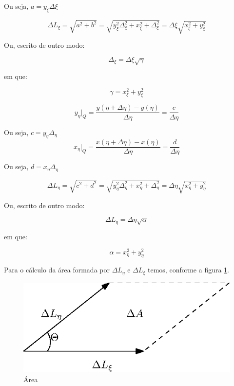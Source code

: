 Ou seja, $a=y_\xi \Delta \xi$

\begin{equation*}
    \Delta L_\xi = \sqrt{a^2+b^2} = \sqrt{y_\xi^2 \Delta_\xi^2 + x_\xi^2+\Delta_\xi^2} = \Delta \xi \sqrt{x_\xi^2 + y_\xi^2}
\end{equation*}

Ou, escrito de outro modo:

\begin{equation}
    \label{eq:2.11}
    \Delta_\xi = \Delta \xi \sqrt{\gamma}
\end{equation}

em que:

\begin{equation}
    \label{eq:2.12}
    \gamma = x_\xi^2 + y_\xi^2
\end{equation}

\begin{equation*}
    y_\eta \vert_Q = \frac{y(\eta+\Delta \eta)-y(\eta)}{\Delta \eta} = \frac{c}{\Delta \eta}
\end{equation*}

Ou seja, $c=y_\eta \Delta_\eta$
\begin{equation*}
    x_\eta \vert_Q = \frac{x(\eta+\Delta \eta)-x(\eta)}{\Delta \eta} = \frac{d}{\Delta \eta}
\end{equation*}

Ou seja, $d=x_\eta \Delta_\eta$

\begin{equation*}
    \Delta L_\eta = \sqrt{c^2+d^2} = \sqrt{y_\eta^2 \Delta_\eta^2 + x_\eta^2+\Delta_\eta^2} = \Delta \eta \sqrt{x_\eta^2 + y_\eta^2}
\end{equation*}

Ou, escrito de outro modo:

\begin{equation}
    \label{eq:2.13}
    \Delta L_\eta = \Delta \eta \sqrt{\alpha}
\end{equation}

em que:

\begin{equation}
    \label{eq:2.14}
    \alpha = x_\eta^2 + y_\eta^2
\end{equation}

Para o cálculo da área formada por $\Delta L_\eta$ e $\Delta L_\xi$ temos, conforme a figura \ref{fig:area}.

\begin{figure}[]
    \centering
    \includegraphics{fig/area.eps}
    \caption{Área}
    \label{fig:area}
\end{figure}

